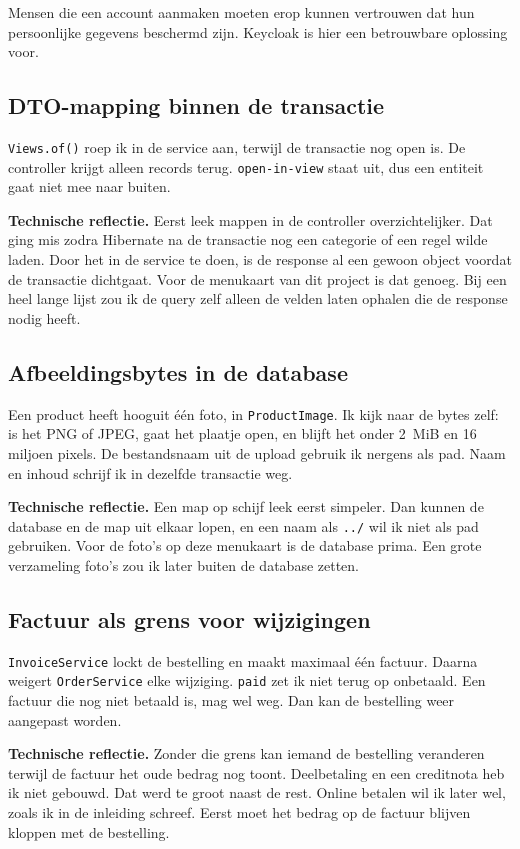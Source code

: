 \documentclass[11pt]{article}
\begin{document}
Mensen die een account aanmaken moeten erop kunnen vertrouwen dat hun
persoonlijke gegevens beschermd zijn. Keycloak is hier een betrouwbare
oplossing voor.

\subsection{DTO-mapping binnen de transactie}
\texttt{Views.of()} roep ik in de service aan, terwijl de transactie nog open
is. De controller krijgt alleen records terug. \texttt{open-in-view} staat uit,
dus een entiteit gaat niet mee naar buiten.

\textbf{Technische reflectie.} Eerst leek mappen in de controller overzichtelijker.
Dat ging mis zodra Hibernate na de transactie nog een categorie of een regel
wilde laden. Door het in de service te doen, is de response al een gewoon object
voordat de transactie dichtgaat. Voor de menukaart van dit project is dat genoeg.
Bij een heel lange lijst zou ik de query zelf alleen de velden laten ophalen die
de response nodig heeft.

\subsection{Afbeeldingsbytes in de database}
Een product heeft hooguit één foto, in \texttt{ProductImage}. Ik kijk naar de
bytes zelf: is het PNG of JPEG, gaat het plaatje open, en blijft het onder
2~MiB en 16 miljoen pixels. De bestandsnaam uit de upload gebruik ik nergens als
pad. Naam en inhoud schrijf ik in dezelfde transactie weg.

\textbf{Technische reflectie.} Een map op schijf leek eerst simpeler. Dan kunnen
de database en de map uit elkaar lopen, en een naam als \texttt{../} wil ik niet
als pad gebruiken. Voor de foto's op deze menukaart is de database prima. Een
grote verzameling foto's zou ik later buiten de database zetten.

\subsection{Factuur als grens voor wijzigingen}
\texttt{InvoiceService} lockt de bestelling en maakt maximaal één factuur.
Daarna weigert \texttt{OrderService} elke wijziging. \texttt{paid} zet ik niet
terug op onbetaald. Een factuur die nog niet betaald is, mag wel weg. Dan kan
de bestelling weer aangepast worden.

\textbf{Technische reflectie.} Zonder die grens kan iemand de bestelling
veranderen terwijl de factuur het oude bedrag nog toont. Deelbetaling en een
creditnota heb ik niet gebouwd. Dat werd te groot naast de rest. Online betalen
wil ik later wel, zoals ik in de inleiding schreef. Eerst moet het bedrag op de
factuur blijven kloppen met de bestelling.
\end{document}

